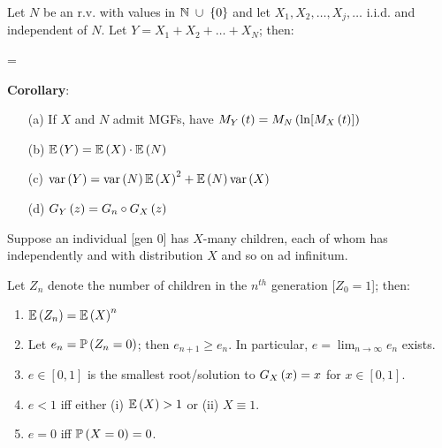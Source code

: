 \documentclass[12pt]{extarticle}
\begin{document}
\begin{tcolorbox}[colback=white]
    \begin{prop}
        Let $N$ be an r.v. with values in $\mathbb{N}\;\cup\;\{0\}$ and let $X_1,X_2,\hdots,X_j,\hdots$ i.i.d. and independent of $N$. Let $Y=X_1+X_2+\hdots+X_N$; then: \begin{eqnbox}
            =
        \end{eqnbox}
    \end{prop}

    \vspace{0pt}
    \ctrrule{12cm}{0.1pt}
    \vspace{4pt}
    
    \noindent
    \begin{minipage}[t]{0.12\textwidth}
        \centering
        \textbf{Corollary}:
    \end{minipage}
    \begin{minipage}[t]{0.85\textwidth}
        \begin{enumerate}
            \item[(a)] If $X$ and $N$ admit MGFs, have $M_{Y}\left(t\right)=M_{N}\left(\ln[M_{X}\left(t\right)]\right)$
            \item[(b)] $\mathbb{E}\left(Y\right)=\mathbb{E}\left(X\right)\cdot\mathbb{E}\left(N\right)$
            \item[(c)] $\text{var}\left(Y\right)=\text{var}\left(N\right)\mathbb{E}\left(X\right)^2+\mathbb{E}\left(N\right)\text{var}\left(X\right)$
            \item[(d)] $G_{Y}\left(z\right)=G_n\circ G_{X}\left(z\right)$
        \end{enumerate}
    \end{minipage}
\end{tcolorbox}

\begin{tcolorbox}[colback=white]
    \begin{theorem}
        Suppose an individual [gen 0] has $X$-many children, each of whom has independently and with distribution $X$ and so on ad infinitum. 

        \vspace{5pt}
        Let $Z_n$ denote the number of children in the $n^{th}$ generation [$Z_0=1$]; then:
        \begin{enumerate}
            \item $\mathbb{E}\left(Z_n\right)=\mathbb{E}\left(X\right)^n$
            \item Let $e_n=\mathbb{P}\left(Z_n=0\right)$; then $e_{n+1}\geq e_n$. In particular, $e=\lim_{n\to\infty}e_n$ exists.
            \item $e\in[0,1]$ is the smallest root/solution to $G_{X}\left(x\right)=x$ for $x\in[0,1]$.
            \item $e<1$ iff either (i) $\mathbb{E}\left(X\right)>1$ or (ii) $X\equiv 1$.
            \item $e=0$ iff $\mathbb{P}\left(X=0\right)=0$.
        \end{enumerate}
    \end{theorem}
\end{tcolorbox}
\end{document}
